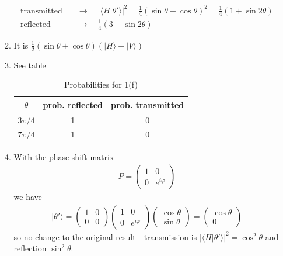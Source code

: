 \documentclass{article}
\begin{document}
\begin{enumerate}
\begin{enumerate}
\begin{align}
            \text{transmitted}&\quad\rightarrow\quad |\langle H|\theta'\rangle|^2=\frac{1}{4}(\sin\theta+\cos\theta)^2=\frac{1}{4}(1+\sin2\theta)\\
            \text{reflected}&\quad\rightarrow\quad \frac{1}{4}(3-\sin2\theta)
        \end{align}
        \item It is $\frac{1}{2}(\sin\theta+\cos\theta)(|H\rangle+|V\rangle)$
        \item See table
        \begin{table}[!h]
            \centering
            \begin{tabular}{c|c|c}
             $\theta$ & prob. reflected & prob. transmitted  \\
             \hline
             $3\pi/4$   & 1 & 0\\
             $7\pi/4$   & 1 & 0
            \end{tabular}
            \caption{Probabilities for 1(f)}
            \label{tab:my_label}
        \end{table}
        \item With the phase shift matrix
        \begin{align}
            P=\begin{pmatrix}
            1 & 0\\
            0 & e^{i\varphi}
            \end{pmatrix}
        \end{align} 
        we have
        \begin{align}
        |\theta'\rangle=
        \begin{pmatrix}
            1 & 0\\
            0 & 0
            \end{pmatrix}
            \begin{pmatrix}
            1 & 0\\
            0 & e^{i\varphi}
            \end{pmatrix}
            \begin{pmatrix}
            \cos\theta\\
            \sin\theta
            \end{pmatrix}=
            \begin{pmatrix}
            \cos\theta\\
            0
            \end{pmatrix}
        \end{align} 
        so no change to the original result - transmission is $|\langle H|\theta'\rangle|^2=\cos^2\theta$ and reflection $\sin^2\theta$.

\end{enumerate}
\end{enumerate}
\end{document}
